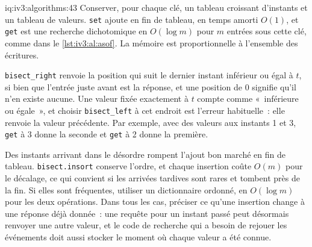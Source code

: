 \begin{solution}{iq:iv3:algorithms:43}
Conserver, pour chaque clé, un tableau croissant d'instants et un tableau de valeurs. \texttt{set} ajoute en fin de tableau, en temps amorti $O(1)$, et \texttt{get} est une recherche dichotomique en $O(\log m)$ pour $m$ entrées sous cette clé, comme dans le \cref{lst:iv3:al:asof}. La mémoire est proportionnelle à l'ensemble des écritures.
\label{lst:iv3:al:asof}

\texttt{bisect\_right} renvoie la position qui suit le dernier instant inférieur ou égal à $t$, si bien que l'entrée juste avant est la réponse, et une position de 0 signifie qu'il n'en existe aucune. Une valeur fixée exactement à $t$ compte comme «~inférieure ou égale~», et choisir \texttt{bisect\_left} à cet endroit est l'erreur habituelle~: elle renvoie la valeur précédente. Par exemple, avec des valeurs aux instants 1 et 3, \texttt{get} à 3 donne la seconde et \texttt{get} à 2 donne la première.

Des instants arrivant dans le désordre rompent l'ajout bon marché en fin de tableau. \texttt{bisect.insort} conserve l'ordre, et chaque insertion coûte $O(m)$ pour le décalage, ce qui convient si les arrivées tardives sont rares et tombent près de la fin. Si elles sont fréquentes, utiliser un dictionnaire ordonné, en $O(\log m)$ pour les deux opérations. Dans tous les cas, préciser ce qu'une insertion change à une réponse déjà donnée~: une requête pour un instant passé peut désormais renvoyer une autre valeur, et le code de recherche qui a besoin de rejouer les événements doit aussi stocker le moment où chaque valeur a été connue.

\end{solution}

